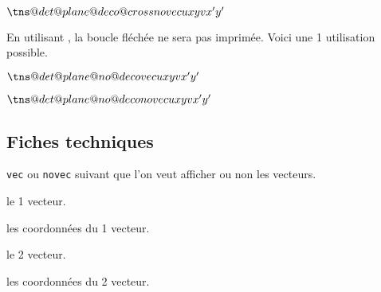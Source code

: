 \documentclass[12pt,a4paper]{article}
\begin{document}
\begin{latexex}
\makeatletter
$\tns@det@plane@deco@cross{novec}    %
                          {u}{x}{y}  %
                          {v}{x'}{y'}$
\makeatother
\end{latexex}




En utilisant , la boucle fléchée ne sera pas imprimée. Voici une 1\iere{} utilisation possible.

\begin{latexex}
\makeatletter
$\tns@det@plane@no@deco{vec}      %
                       {u}{x}{y}  %
                       {v}{x'}{y'}$
\makeatother
\end{latexex}





\begin{latexex}
\makeatletter
$\tns@det@plane@no@deco{novec}    %
                       {u}{x}{y}  %
                       {v}{x'}{y'}$
\makeatother
\end{latexex}




\subsection{Fiches techniques}




 \verb+vec+ ou \verb+novec+ suivant que l'on veut afficher ou non les vecteurs. 

 le 1\ier{} vecteur.

 les coordonnées du 1\ier{} vecteur.

 le 2\ieme{} vecteur.

 les coordonnées du 2\ieme{} vecteur.
\end{document}
